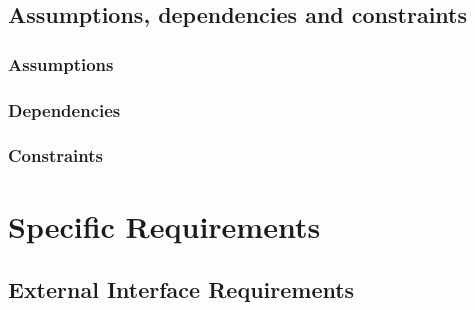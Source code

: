 \documentclass{article}
\begin{document}
\subsection{Assumptions, dependencies and constraints}
\subsubsection{Assumptions}
\subsubsection{Dependencies}
\subsubsection{Constraints}
\newpage
\section{Specific Requirements}
\subsection{External Interface Requirements}
\end{document}
